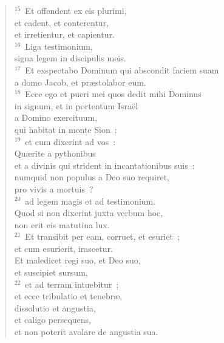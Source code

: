 \begin{verse}
${}^{15}$~Et offendent ex eis plurimi,\\ et cadent, et conterentur,\\ et irretientur, et capientur.\\
${}^{16}$~Liga testimonium,\\ signa legem in discipulis meis.\\
${}^{17}$~Et exspectabo Dominum qui abscondit faciem suam\\ a domo Jacob, et pr\ae stolabor eum.\\
${}^{18}$~Ecce ego et pueri mei quos dedit mihi Dominus\\ in signum, et in portentum Isra\"el\\ a Domino exercituum,\\ qui habitat in monte Sion~:\\
${}^{19}$~et cum dixerint ad vos~:\\ Qu\ae rite a pythonibus\\ et a divinis qui strident in incantationibus suis~:\\ numquid non populus a Deo suo requiret,\\ pro vivis a mortuis~?\\
${}^{20}$~ad legem magis et ad testimonium.\\ Quod si non dixerint juxta verbum hoc,\\ non erit eis matutina lux.\\
${}^{21}$~Et transibit per eam, corruet, et esuriet~;\\ et cum esurierit, irascetur.\\ Et maledicet regi suo, et Deo suo,\\ et suscipiet sursum,\\
${}^{22}$~et ad terram intuebitur~;\\ et ecce tribulatio et tenebr\ae ,\\ dissolutio et angustia,\\ et caligo persequens,\\ et non poterit avolare de angustia sua.\end{verse}


